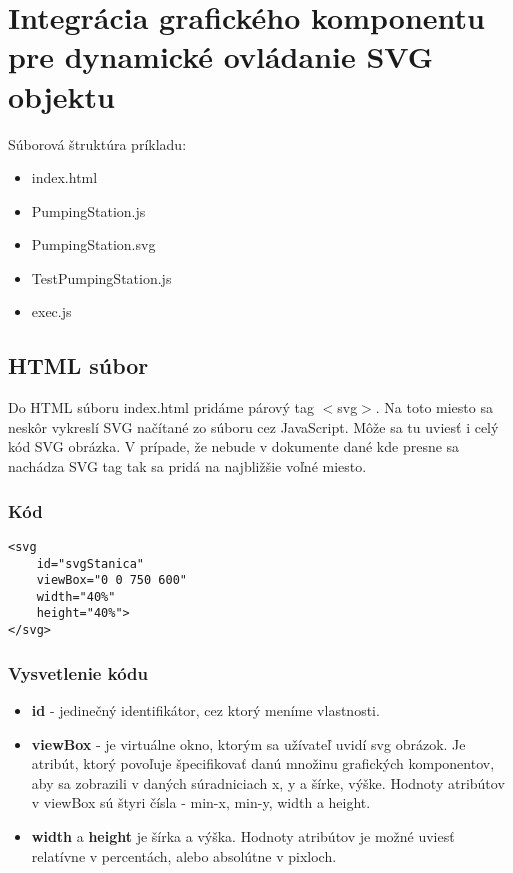 \chapter{Integrácia grafického komponentu pre dynamické ovládanie SVG objektu}

Súborová štruktúra príkladu: 
\begin{itemize}
	\item index.html 
	\item PumpingStation.js
	\item PumpingStation.svg
	\item TestPumpingStation.js
	\item exec.js 
\end{itemize}

\section{HTML súbor}
Do HTML súboru index.html pridáme párový tag $<$svg$>$. Na toto miesto sa neskôr vykreslí SVG načítané zo súboru cez JavaScript. Môže sa tu uviesť i celý kód SVG obrázka. V prípade, že nebude v dokumente dané kde presne sa nachádza SVG tag tak sa pridá na najbližšie voľné miesto. 
\subsection{Kód}
\begin{lstlisting}
<svg 
	id="svgStanica" 
	viewBox="0 0 750 600" 
	width="40%" 
	height="40%"> 
</svg>
\end{lstlisting}

\subsection{Vysvetlenie kódu}
\begin{itemize}
\item  \textbf{id} - jedinečný identifikátor, cez ktorý meníme vlastnosti.
\item 	\textbf{viewBox} - je virtuálne okno, ktorým sa užívateľ uvidí svg obrázok. Je atribút, ktorý povoľuje špecifikovať danú množinu grafických komponentov, aby sa zobrazili v daných súradniciach x, y a šírke, výške. Hodnoty atribútov v viewBox sú štyri čísla - min-x, min-y, width a height. 
\item 	\textbf{width} a \textbf{height} je šírka a výška. Hodnoty atribútov je možné uviesť relatívne v percentách, alebo absolútne v pixloch. 
\end{itemize}

